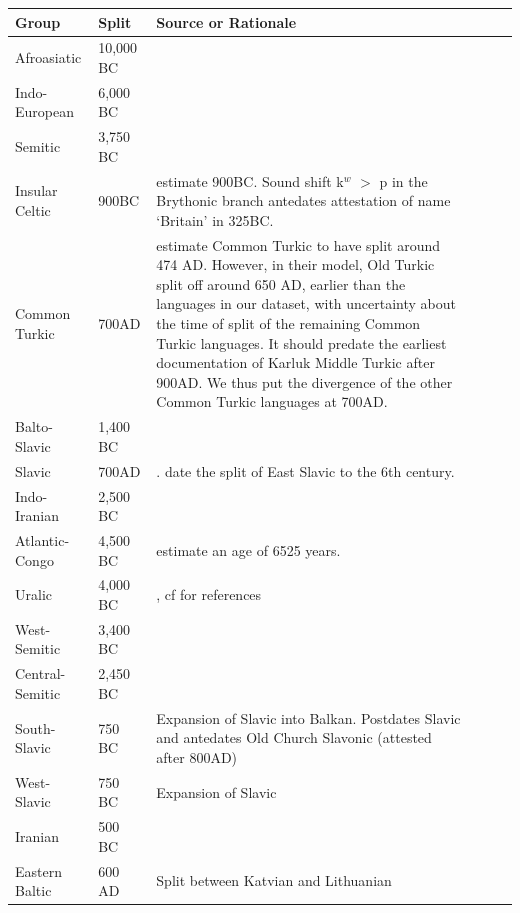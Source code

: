 \documentclass[11pt,a4paper]{article}
\begin{document}
\begin{longtable}{llp{10cm}lll}
Group & Split & Source or Rationale \\ \hline
Afroasiatic & 10,000 BC & \cite{diakonoff1998the} \\
Indo-European & 6,000 BC & \citep{gray2003language} \\
Semitic & 3,750 BC & \citep{kitchen2009bayesian} \\
Insular Celtic & 900BC & \citep{gray2003language} estimate 900BC. Sound shift k$^w$ $>$ p in the Brythonic branch antedates attestation of name `Britain' in 325BC. \\ %
Common Turkic & 700AD & \cite[p. 49]{savelyev2020bayesian} estimate Common Turkic to have split around 474 AD. However, in their model, Old Turkic split off around 650 AD, earlier than the languages in our dataset, with uncertainty about the time of split of the remaining Common Turkic languages. It should predate the earliest documentation of Karluk Middle Turkic after 900AD. We thus put the divergence of the other Common Turkic languages at 700AD. \\
Balto-Slavic & 1,400 BC & \citep{gray2003language} \\
Slavic       & 700AD & \citep{gray2003language}. \citet[p. 209]{novotna2011glottochronology} date the split of East Slavic to the 6th century. \\
Indo-Iranian & 2,500 BC & \citep[p. 138]{parpola2013formation} \\ %
	Atlantic-Congo & 4,500 BC & \citet{holman2011automated} estimate an age of 6525 years.\\
Uralic & 4,000 BC & \citep{maurits2020best}, cf \citep[p. 144]{parpola2013formation} for references \\
West-Semitic & 3,400 BC & \citep{kitchen2009bayesian}  \\
Central-Semitic & 2,450 BC & \citep{kitchen2009bayesian}   \\
South-Slavic & 750 BC & Expansion of Slavic into Balkan. Postdates Slavic and antedates Old Church Slavonic (attested after 800AD) \\
West-Slavic & 750 BC & Expansion of Slavic \\
Iranian & 500 BC & \citep{gray2003language} \\ %
Eastern Baltic & 600 AD & Split between Katvian and Lithuanian \citep[p. 209]{novotna2011glottochronology}\\

\end{longtable}
\end{document}
